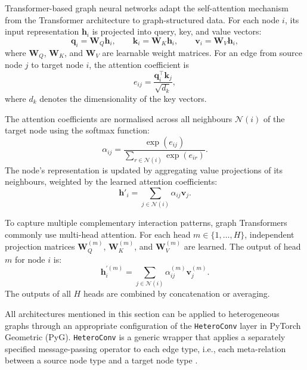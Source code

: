 Transformer-based graph neural networks adapt the self-attention mechanism
from the Transformer architecture \textcite{vaswani2017attention} to
graph-structured data.
For each node $i$, its input representation $\mathbf{h}_i$ is projected into
query, key, and value vectors:
\begin{equation}
\mathbf{q}_i = \mathbf{W}_{Q}\mathbf{h}_i, \qquad
\mathbf{k}_i = \mathbf{W}_{K}\mathbf{h}_i, \qquad
\mathbf{v}_i = \mathbf{W}_{V}\mathbf{h}_i,
\end{equation}
where $\mathbf{W}_{Q}$, $\mathbf{W}_{K}$, and $\mathbf{W}_{V}$ are learnable
weight matrices.
For an edge from source node $j$ to target node $i$, the attention
coefficient is
\begin{equation}
    e_{ij} =
    \frac{\mathbf{q}_{i}^{\top}\mathbf{k}_{j}}{\sqrt{d_k}},
    \end{equation}
    where $d_k$ denotes the dimensionality of the key vectors.

The attention coefficients are normalised across all neighbours
$\mathcal{N}(i)$ of the target node using the softmax function:
    \begin{equation}
    \alpha_{ij} =
    \frac{\exp(e_{ij})}
    {\sum_{r \in \mathcal{N}(i)} \exp(e_{ir})}.
    \end{equation}
The node's representation is updated by aggregating value projections of
its neighbours, weighted by the learned attention coefficients:
\begin{equation}
\mathbf{h}'_i =
\sum_{j \in \mathcal{N}(i)}
\alpha_{ij}\mathbf{v}_{j}.
\end{equation}

To capture multiple complementary interaction patterns, graph Transformers
commonly use multi-head attention.
For each head $m \in \{1, \ldots, H\}$, independent projection matrices
$\mathbf{W}_{Q}^{(m)}$, $\mathbf{W}_{K}^{(m)}$, and
$\mathbf{W}_{V}^{(m)}$ are learned.
The output of head $m$ for node $i$ is:
\begin{equation}
\mathbf{h}_i^{\prime(m)} =
\sum_{j \in \mathcal{N}(i)}
\alpha_{ij}^{(m)}\mathbf{v}_{j}^{(m)}.
\end{equation}
The outputs of all $H$ heads are combined by concatenation or averaging.

All architectures mentioned in this section can be applied to heterogeneous
graphs through an appropriate configuration of the \texttt{HeteroConv} layer in
PyTorch Geometric (PyG). \texttt{HeteroConv} is a generic wrapper that applies
a separately specified message-passing operator to each edge type, i.e., each
meta-relation between a source node type and a target node type
\textcite{wojcik2026grafowe}.

